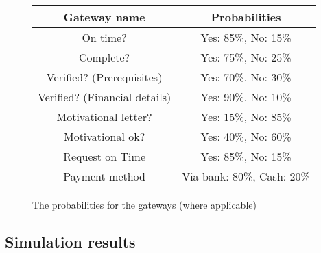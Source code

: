 \begin{figure}[h!]
	\centering
	\begin{tabular}{ | c | c | }
		\hline
		\textbf{Gateway name} & \textbf{Probabilities} \\ \hline\hline
		On time? & Yes: 85\%, No: 15\% \\ \hline
		Complete? & Yes: 75\%, No: 25\% \\ \hline
		Verified? (Prerequisites) & Yes: 70\%, No: 30\% \\ \hline
		Verified? (Financial details) & Yes: 90\%, No: 10\% \\ \hline
		Motivational letter? & Yes: 15\%, No: 85\% \\ \hline
		Motivational ok? & Yes: 40\%, No: 60\% \\ \hline
		Request on Time & Yes: 85\%, No: 15\% \\ \hline	
		Payment method & Via bank: 80\%, Cash: 20\% \\ \hline			
		\hline
	\end{tabular}
	\caption{The probabilities for the gateways (where applicable)}
	\label{fig:tasktimes1}
\end{figure}


\subsection{Simulation results}